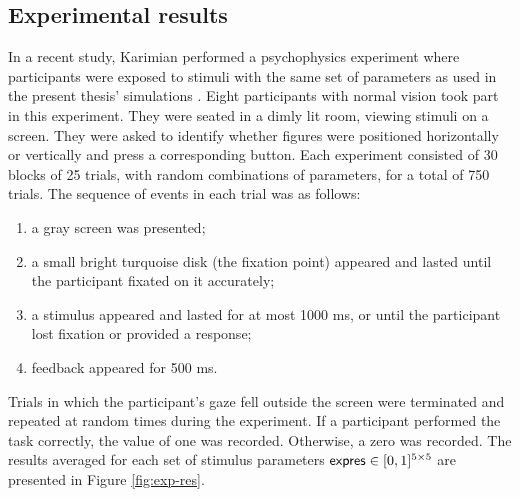 \subsection{Experimental results}

In a recent study, Karimian performed a psychophysics experiment where participants were exposed to stimuli with the same set of parameters as used in the present thesis' simulations \cite{MaryamPLACEHOLDER}.
Eight participants with normal vision took part in this experiment. They were seated in a dimly lit room, viewing stimuli on a screen. They were asked to identify whether figures were positioned horizontally or vertically and press a corresponding button. Each experiment consisted of 30 blocks of 25 trials, with random combinations of parameters, for a total of 750 trials. The sequence of events in each trial was as follows: 
\begin{enumerate}
    \item a gray screen was presented;
    \item a small bright turquoise disk (the fixation point) appeared and lasted until the participant fixated on it accurately;
    \item a stimulus appeared and lasted for at most 1000 ms, or until the participant lost fixation or provided a response;
    \item feedback appeared for 500 ms.
\end{enumerate}
Trials in which the participant's gaze fell outside the screen were terminated and repeated at random times during the experiment. If a participant performed the task correctly, the value of one was recorded. Otherwise, a zero was recorded.
The results averaged for each set of stimulus parameters $\mathsf{expres} \in [0, 1]^{5 \times 5}$ are presented in Figure \ref{fig:exp-res}. 


